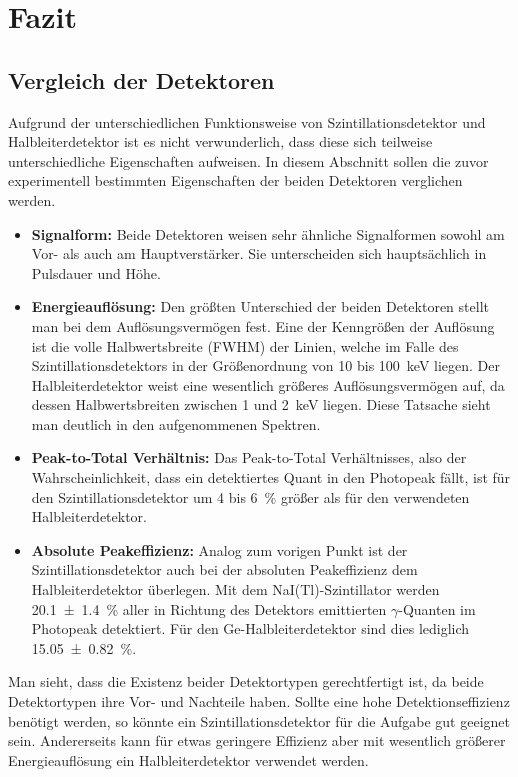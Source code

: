 \documentclass[11pt, a4paper]{article}
\numberwithin{equation}{section}
\begin{document}
\section{Fazit}

\subsection{Vergleich der Detektoren}
Aufgrund der unterschiedlichen Funktionsweise von Szintillationsdetektor und Halbleiterdetektor ist es nicht verwunderlich, dass diese sich teilweise unterschiedliche Eigenschaften aufweisen.
In diesem Abschnitt sollen die zuvor experimentell bestimmten Eigenschaften der beiden Detektoren verglichen werden.
\begin{itemize}
	\item \textbf{Signalform:} Beide Detektoren weisen sehr ähnliche Signalformen sowohl am Vor- als auch am Hauptverstärker. Sie unterscheiden sich hauptsächlich in Pulsdauer und Höhe.
	
	\item \textbf{Energieauflösung:} Den größten Unterschied der beiden Detektoren stellt man bei dem Auflösungsvermögen fest.
	Eine der Kenngrößen der Auflösung ist die volle Halbwertsbreite (FWHM) der Linien, welche im Falle des Szintillationsdetektors in der Größenordnung von \num{10} bis \SI{100}{keV} liegen.
	Der Halbleiterdetektor weist eine wesentlich größeres Auflösungsvermögen auf, da dessen Halbwertsbreiten zwischen \num{1} und \SI{2}{keV} liegen.
	Diese Tatsache sieht man deutlich in den aufgenommenen Spektren.	
	
	\item \textbf{Peak-to-Total Verhältnis:}
	Das Peak-to-Total Verhältnisses, also der Wahrscheinlichkeit, dass ein detektiertes Quant in den Photopeak fällt, ist für den Szintillationsdetektor um \num{4} bis \SI{6}{\percent} größer als für den verwendeten Halbleiterdetektor.
	
	\item \textbf{Absolute Peakeffizienz:}
	Analog zum vorigen Punkt ist der Szintillationsdetektor auch bei der absoluten Peakeffizienz dem Halbleiterdetektor überlegen.
	Mit dem NaI(Tl)-Szintillator werden \SI{20.1 +- 1.4}{\percent} aller in Richtung des Detektors emittierten $\gamma$-Quanten im Photopeak detektiert.
	Für den Ge-Halbleiterdetektor sind dies lediglich \SI{15.05 +- 0.82}{\percent}.
	
\end{itemize}
Man sieht, dass die Existenz beider Detektortypen gerechtfertigt ist, da beide Detektortypen ihre Vor- und Nachteile haben.
Sollte eine hohe Detektionseffizienz benötigt werden, so könnte ein Szintillationsdetektor für die Aufgabe gut geeignet sein.
Andererseits kann für etwas geringere Effizienz aber mit wesentlich größerer Energieauflösung ein Halbleiterdetektor verwendet werden.
\end{document}
